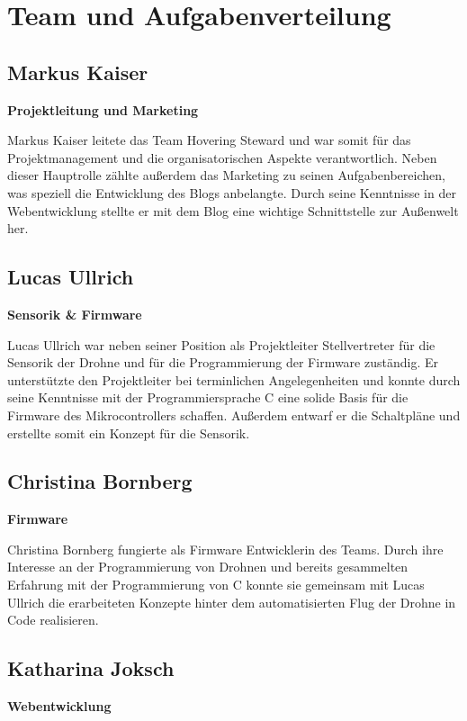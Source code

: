 \section{Team und Aufgabenverteilung}
  \subsection*{Markus Kaiser}
  \textbf{Projektleitung und Marketing}

  Markus Kaiser leitete das Team Hovering Steward und war somit für das Projektmanagement und
  die organisatorischen Aspekte verantwortlich. Neben dieser Hauptrolle zählte außerdem das Marketing
  zu seinen Aufgabenbereichen, was speziell die Entwicklung des Blogs anbelangte. Durch seine Kenntnisse
  in der Webentwicklung stellte er mit dem Blog eine wichtige Schnittstelle zur Außenwelt her.

  \subsection*{Lucas Ullrich}
  \textbf{Sensorik \& Firmware}

  Lucas Ullrich war neben seiner Position als Projektleiter Stellvertreter für die Sensorik der Drohne und
  für die Programmierung der Firmware zuständig. Er unterstützte den Projektleiter bei terminlichen Angelegenheiten
  und konnte durch seine Kenntnisse mit der Programmiersprache C eine solide Basis für die Firmware des Mikrocontrollers schaffen.
  Außerdem entwarf er die Schaltpläne und erstellte somit ein Konzept für die Sensorik.

  \subsection*{Christina Bornberg}
  \textbf{Firmware}

  Christina Bornberg fungierte als Firmware Entwicklerin des Teams. Durch ihre Interesse an der Programmierung von Drohnen
  und bereits gesammelten Erfahrung mit der Programmierung von C konnte sie gemeinsam mit Lucas Ullrich die erarbeiteten Konzepte hinter
  dem automatisierten Flug der Drohne in Code realisieren.

  \subsection*{Katharina Joksch}
  \textbf{Webentwicklung}

